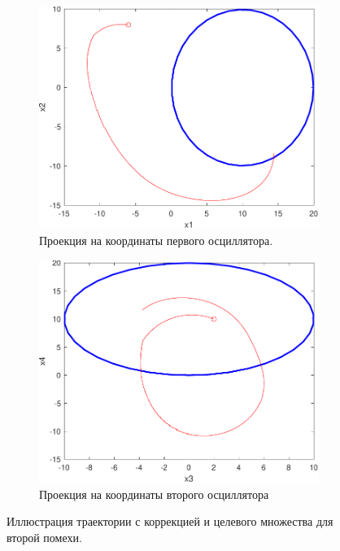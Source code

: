 \begin{figure}[ht]
    \centering
    \begin{subfigure}[b]{0.45\textwidth}
        \centering
        \includegraphics[width=\textwidth]{./resources/synthesis_2_first.pdf}
        \caption{Проекция на координаты первого осциллятора.}
        \label{subfig:synthesis_2_first}
    \end{subfigure}
    \hfill
    \begin{subfigure}[b]{0.45\textwidth}
        \centering
        \includegraphics[width=\textwidth]{./resources/synthesis_2_second.pdf}
        \caption{Проекция на координаты второго осциллятора}
        \label{subfig:synthesis_2_second}
    \end{subfigure}
    \caption{Иллюстрация траектории с коррекцией и целевого множества для второй помехи.}
    \label{fig:synthesis_2}
\end{figure}